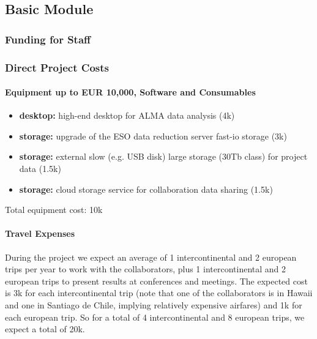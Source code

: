 \documentclass[10pt,fleqn,twoside]{article}
\begin{document}
\subsection{Basic Module}

\subsubsection{Funding for Staff}

\todo{[Text]}


\subsubsection{Direct Project Costs}

\todo{[Text]}

\paragraph{Equipment up to EUR 10,000, Software and Consumables}

\begin{itemize}
\item {\bf desktop:} high-end desktop for ALMA data analysis (4k\EUR{}) 
\item {\bf storage:} upgrade of the ESO data reduction server fast-io storage (3k\EUR{})
\item {\bf storage:} external slow (e.g. USB disk) large storage (30Tb class) for project data (1.5k\EUR{})
\item {\bf storage:} cloud storage service for collaboration data sharing (1.5k\EUR{})
\end{itemize}

Total equipment cost: 10k\EUR{}  

\paragraph{Travel Expenses}

During the project we expect an average of 1 intercontinental and 2 european
trips per year to work with the collaborators, plus 1 intercontinental and 2
european trips to present results at conferences and meetings. The expected
cost is 3k\EUR{} for each intercontinental trip (note that one of the
collaborators is in Hawaii and one in Santiago de Chile, implying relatively
expensive airfares) and 1k\EUR{} for each european trip. So for a total of
4 intercontinental and 8 european trips, we expect a total of 20k\EUR{}.  \smallskip
\end{document}
